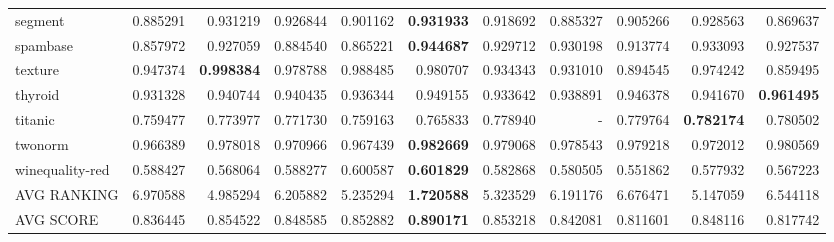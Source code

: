 \begin{tabular}{lrrrrrrrrrr}
segment         &   0.885291 &  0.931219 &  0.926844 &  0.901162 &  \textbf{0.931933} &  0.918692 &  0.885327 &  0.905266 &  0.928563 &  0.869637 \\
spambase        &   0.857972 &  0.927059 &  0.884540 &  0.865221 &  \textbf{0.944687} &  0.929712 &  0.930198 &  0.913774 &  0.933093 &  0.927537 \\
texture         &   0.947374 &  \textbf{0.998384} &  0.978788 &  0.988485 &  0.980707 &  0.934343 &  0.931010 &  0.894545 &  0.974242 &  0.859495 \\
thyroid         &   0.931328 &  0.940744 &  0.940435 &  0.936344 &  0.949155 &  0.933642 &  0.938891 &  0.946378 &  0.941670 &  \textbf{0.961495} \\
titanic         &   0.759477 &  0.773977 &  0.771730 &  0.759163 &  0.765833 &  0.778940 &       - &  0.779764 &  \textbf{0.782174} &  0.780502 \\
twonorm         &   0.966389 &  0.978018 &  0.970966 &  0.967439 &  \textbf{0.982669} &  0.979068 &  0.978543 &  0.979218 &  0.972012 &  0.980569 \\
winequality-red &   0.588427 &  0.568064 &  0.588277 &  0.600587 &  \textbf{0.601829} &  0.582868 &  0.580505 &  0.551862 &  0.577932 &  0.567223 \\
\bottomrule
AVG RANKING & 6.970588 & 4.985294 & 6.205882 & 5.235294 & \textbf{1.720588} & 5.323529 & 6.191176 & 6.676471 & 5.147059 & 6.544118 \\
AVG SCORE & 0.836445 & 0.854522 & 0.848585 & 0.852882 & \textbf{0.890171} & 0.853218 & 0.842081 & 0.811601 & 0.848116 & 0.817742 \\
\end{tabular}

